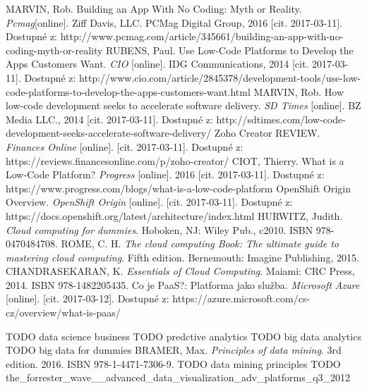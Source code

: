 \begin{thebibliography}{99}

MARVIN, Rob. Building an App With No Coding: Myth or Reality. 
\textit{Pcmag}[online].
 Ziff Davis, LLC. PCMag Digital Group, 2016 [cit. 2017-03-11]. Dostupné z: http://www.pcmag.com/article/345661/building-an-app-with-no-coding-myth-or-reality
RUBENS, Paul. Use Low-Code Platforms to Develop the Apps Customers Want.
\textit{CIO} [online].
IDG Communications, 2014 [cit. 2017-03-11]. Dostupné z: http://www.cio.com/article/2845378/development-tools/use-low-code-platforms-to-develop-the-apps-customers-want.html
MARVIN, Rob. How low-code development seeks to accelerate software delivery.
\textit{SD Times} [online].
BZ Media LLC., 2014 [cit. 2017-03-11]. Dostupné z: http://sdtimes.com/low-code-development-seeks-accelerate-software-delivery/
Zoho Creator REVIEW.
\textit{Finances Online} [online].
[cit. 2017-03-11]. Dostupné z: https://reviews.financesonline.com/p/zoho-creator/
CIOT, Thierry. What is a Low-Code Platform?
\textit{Progress} [online].
2016 [cit. 2017-03-11]. Dostupné z: https://www.progress.com/blogs/what-is-a-low-code-platform
OpenShift Origin Overview.
\textit{OpenShift Origin} [online].
[cit. 2017-03-11]. Dostupné z: https://docs.openshift.org/latest/architecture/index.html
HURWITZ, Judith.
\textit{Cloud computing for dummies}.
Hoboken, NJ: Wiley Pub., c2010. ISBN 978-0470484708.
ROME, C. H. 
\textit{The cloud computing Book: The ultimate guide to mastering cloud computing}.
Fifth edition. Bernemouth: Imagine Publishing, 2015.
CHANDRASEKARAN, K. 
\textit{Essentials of Cloud Computing}.
Maiami: CRC Press, 2014. ISBN 978-1482205435.
Co je PaaS?: Platforma jako služba.
\textit{Microsoft Azure} [online].
[cit. 2017-03-12]. Dostupné z: https://azure.microsoft.com/cs-cz/overview/what-is-paas/

TODO data science business
TODO predctive analytics
TODO big data analytics
TODO big data for dummies
BRAMER, Max.
\textit{Principles of data mining}.
3rd edition. 2016. ISBN 978-1-4471-7306-9.
TODO data mining principles
TODO the_forrester_wave__advanced_data_visualization_adv_platforms_q3_2012


\end{thebibliography}
